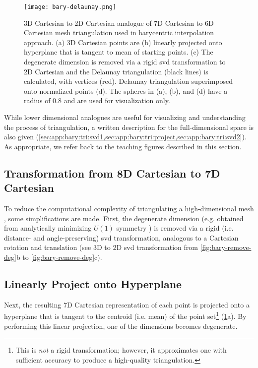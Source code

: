 \documentclass[final,12pt]{elsarticle}
\begin{document}
\begin{figure}
	\centering
	\texttt{[image: bary-delaunay.png]}
	\caption{3D Cartesian to 2D Cartesian analogue of 7D Cartesian to 6D Cartesian mesh triangulation used in barycentric interpolation approach. (a) 3D Cartesian \inpt{} points are (b) linearly projected onto hyperplane that is tangent to mean of starting points. (c) The degenerate dimension is removed via a rigid \gls{svd} transformation to 2D Cartesian and the Delaunay triangulation (black lines) is calculated, with \inpt{} vertices (red). Delaunay triangulation superimposed onto normalized \inpt{} points (d). The spheres in (a), (b), and (d) have a radius of 0.8 and are used for visualization only.}
	\label{fig:bary-delaunay}
\end{figure}

While lower dimensional analogues are useful for visualizing and understanding the process of triangulation, a written description for the full-dimensional space is also given (\cref{sec:app:bary:tri:svd1,sec:app:bary:tri:project,sec:app:bary:tri:svd2}). As appropriate, we refer back to the teaching figures described in this section.

\subsection{ Transformation from 8D Cartesian to 7D Cartesian}
\label{sec:app:bary:tri:svd1}
To reduce the computational complexity of triangulating a high-dimensional mesh \cite{barberQuickhullAlgorithmConvex1996}, some simplifications are made. First, the degenerate dimension (e.g. obtained from analytically minimizing $U(1)$ symmetry \cite{francisGeodesicOctonionMetric2019}) is removed via a rigid (i.e. distance- and angle-preserving) \gls{svd} transformation,
analogous to a Cartesian rotation and translation (see 3D to 2D \gls{svd} transformation from \cref{fig:bary-remove-deg}b to \cref{fig:bary-remove-deg}c).

\subsection{Linearly Project onto Hyperplane}
\label{sec:app:bary:tri:project}
Next, the resulting 7D Cartesian representation of each point is projected onto a hyperplane that is tangent to the centroid (i.e. mean) of the point set\footnote{This is \textit{not} a rigid transformation; however, it approximates one with sufficient accuracy to produce a high-quality triangulation.} (\cref{fig:bary-delaunay}a). By performing this linear projection, one of the dimensions becomes degenerate.
\end{document}
